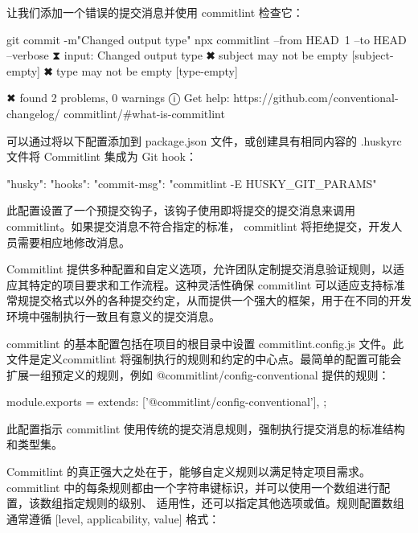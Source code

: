 让我们添加一个错误的提交消息并使用 commitlint 检查它：

\begin{shell}
git commit -m"Changed output type"
npx commitlint --from HEAD~1 --to HEAD --verbose
⧗ input: Changed output type
✖ subject may not be empty [subject-empty]
✖ type may not be empty [type-empty]

✖ found 2 problems, 0 warnings
ⓘ Get help: https://github.com/conventional-changelog/
commitlint/#what-is-commitlint
\end{shell}

可以通过将以下配置添加到 package.json 文件，或创建具有相同内容的 .huskyrc 文件将 Commitlint 集成为 Git hook：

\begin{shell}
"husky": {
    "hooks": {
        "commit-msg": "commitlint -E HUSKY_GIT_PARAMS"
    }
}
\end{shell}

此配置设置了一个预提交钩子，该钩子使用即将提交的提交消息来调用 commitlint。如果提交消息不符合指定的标准， commitlint 将拒绝提交，开发人员需要相应地修改消息。


Commitlint 提供多种配置和自定义选项，允许团队定制提交消息验证规则，以适应其特定的项目要求和工作流程。这种灵活性确保 commitlint 可以适应支持标准常规提交格式以外的各种提交约定，从而提供一个强大的框架，用于在不同的开发环境中强制执行一致且有意义的提交消息。


commitlint 的基本配置包括在项目的根目录中设置 commitlint.config.js 文件。此文件是定义commitlint 将强制执行的规则和约定的中心点。最简单的配置可能会扩展一组预定义的规则，例如 @commitlint/config-conventional 提供的规则：

\begin{shell}
module.exports = {
    extends: ['@commitlint/config-conventional'],
};
\end{shell}

此配置指示 commitlint 使用传统的提交消息规则，强制执行提交消息的标准结构和类型集。


Commitlint 的真正强大之处在于，能够自定义规则以满足特定项目需求。 commitlint 中的每条规则都由一个字符串键标识，并可以使用一个数组进行配置，该数组指定规则的级别、 适用性，还可以指定其他选项或值。规则配置数组通常遵循 [level, applicability, value] 格式：


